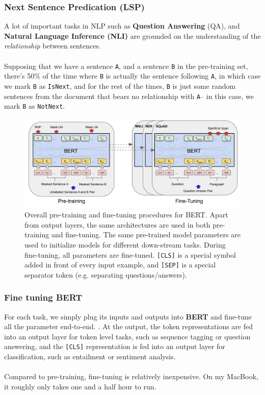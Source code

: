 \documentclass[paper=a4, fontsize=12pt]{scrartcl}
\begin{document}
\subsubsection{Next Sentence Predication (LSP)} 
A lot of important tasks in NLP such as \textbf{Question Answering} (QA), and \textbf{Natural Language Inference (NLI)} are grounded on the understanding of the \textit{relationship} between sentences. \\\\
Supposing that we have a sentence \texttt{A}, and a sentence \texttt{B} in the pre-training set, there's 50\% of the time where \texttt{B} is actually the sentence following \texttt{A}, in which case we mark \texttt{B} as \texttt{IsNext}, and for the rest of the times, \texttt{B} is just some random sentences from the document that bears no relationship with \texttt{A}-- in this case, we mark \texttt{B} as \texttt{NotNext}.
 \begin{figure}
  \includegraphics[scale=0.40]{bertprocedure.png}
  \caption{Overall pre-training and fine-tuning procedures for BERT. Apart from output layers, the same architectures are used in both pre-training and fine-tuning. The same pre-trained model parameters are used to initialize models for different down-stream tasks. During fine-tuning, all parameters are fine-tuned. \texttt{[CLS]} is a special symbol added in front of every input example, and \texttt{[SEP]} is a special separator token (e.g. separating questions/answers).}
  \label{fig:skip-gram}
\end{figure}
\subsubsection{Fine tuning \textbf{BERT}}
For each task, we simply plug its inputs and outputs into \textbf{BERT} and fine-tune all the parameter end-to-end. . At the output, the token representations are fed into an output layer for token level tasks, such as sequence tagging or question answering, and the \texttt{[CLS]} representation is fed into an output layer for classification, such as entailment or sentiment analysis.\\\\
Compared to pre-training, fine-tuning is relatively inexpensive. On my MacBook, it roughly only takes one and a half hour to run.
\end{document}
